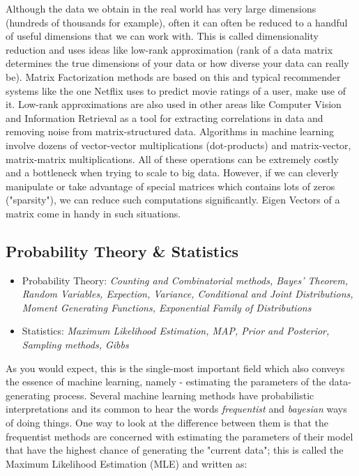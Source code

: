 \documentclass[a4paper]{article}
\begin{document}
\noindent Although the data we obtain in the real world has very large dimensions (hundreds of thousands for example), often it can often be reduced to a handful of useful dimensions that we can work with. This is called dimensionality reduction and uses ideas like low-rank approximation (rank of a data matrix determines the true dimensions of your data or how diverse your data can really be). Matrix Factorization methods are based on this and typical recommender systems like the one Netflix uses to predict movie ratings of a user, make use of it. Low-rank approximations are also used in other areas like Computer Vision and Information Retrieval as a tool for extracting correlations in data and removing noise from matrix-structured data. Algorithms in machine learning involve dozens of vector-vector multiplications (dot-products) and matrix-vector, matrix-matrix multiplications. All of these operations can be extremely costly and a bottleneck when trying to scale to big data. However, if we can cleverly manipulate or take advantage of special matrices which contains lots of zeros ("sparsity"), we can reduce such computations significantly. Eigen Vectors of a matrix come in handy in such situations.\\

\subsection{Probability Theory \& Statistics}
\begin{itemize}
\item Probability Theory: \textit{Counting and Combinatorial methods, Bayes' Theorem, Random Variables, Expection, Variance, Conditional and Joint Distributions, Moment Generating Functions, Exponential Family of Distributions}
\item Statistics: \textit{Maximum Likelihood Estimation, MAP, Prior and Posterior, Sampling methods, Gibbs}
\end{itemize}
As you would expect, this is the single-most important field which also conveys the essence of machine learning, namely - estimating the parameters of the data-generating process. Several machine learning methods have probabilistic interpretations and its common to hear the words {\it frequentist} and {\it bayesian} ways of doing things. One way to look at the difference between them is that the frequentist methods are concerned with estimating the parameters of their model that have the highest chance of generating the "current data"; this is called the Maximum Likelihood Estimation (MLE) and written as: \\
\end{document}
